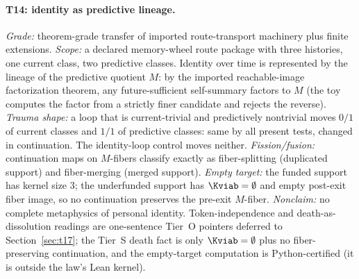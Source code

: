 \paragraph{T14: identity as predictive lineage.}
\begin{theorem}
\gradeS{} \emph{Grade:} theorem-grade transfer of imported route-transport
machinery plus finite extensions. \emph{Scope:} a declared memory-wheel route
package with three histories, one current class, two predictive classes.
Identity over time is represented by the lineage of the predictive quotient
$M$: by the imported reachable-image factorization theorem, any
future-sufficient self-summary factors to $M$ (the toy computes the factor
from a strictly finer candidate and rejects the reverse). \emph{Trauma
shape:} a loop that is current-trivial and predictively nontrivial moves
$0/1$ of current classes and $1/1$ of predictive classes: same by all
present tests, changed in continuation. The identity-loop control moves
neither. \emph{Fission/fusion:} continuation maps on $M$-fibers classify
exactly as fiber-splitting (duplicated support) and fiber-merging (merged
support). \emph{Empty target:} the funded support has kernel size $3$; the
underfunded support has $\Kviab=\emptyset$ and empty post-exit fiber image,
so no continuation preserves the pre-exit $M$-fiber. \emph{Nonclaim:} no
complete metaphysics of personal identity. Token-independence and
death-as-dissolution readings are one-sentence Tier~O pointers deferred to
Section~\ref{sec:t17}; the Tier~S death fact is only $\Kviab=\emptyset$ plus
no fiber-preserving continuation, and the empty-target computation is
Python-certified (it is outside the law's Lean kernel).
\end{theorem}

